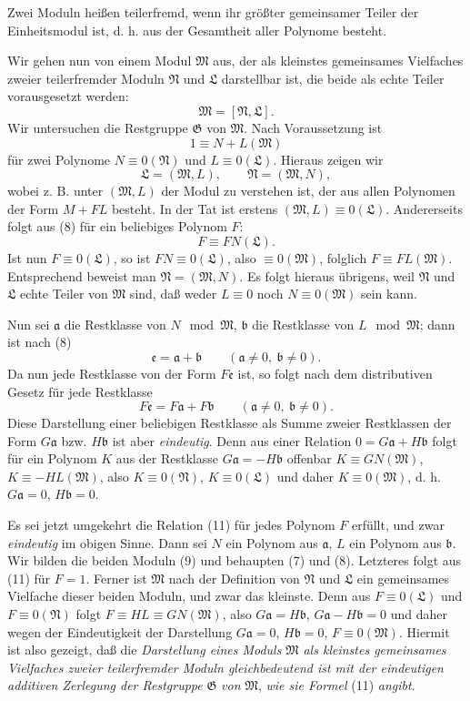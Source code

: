\documentclass[11pt]{article}
\newcommand{\mM}{\mathfrak{M}}
\newcommand{\mN}{\mathfrak{N}}
\newcommand{\mL}{\mathfrak{L}}
\newcommand{\mG}{\mathfrak{G}}
\newcommand{\ma}{\mathfrak{a}}
\newcommand{\mb}{\mathfrak{b}}
\newcommand{\me}{\mathfrak{e}}
\begin{document}
Zwei Moduln heißen teilerfremd, wenn ihr größter gemeinsamer Teiler der Einheitsmodul ist, d. h. aus der Gesamtheit aller Polynome besteht.

Wir gehen nun von einem Modul $\mM$ aus, der als kleinstes gemeinsames Vielfaches zweier teilerfremder Moduln $\mN$ und $\mL$ darstellbar ist, die beide als echte Teiler vorausgesetzt werden:
\begin{equation}
 \mM=[\mN,\mL].
\tag{7}
\end{equation}
Wir untersuchen die Restgruppe $\mG$ von $\mM$. Nach Voraussetzung ist
\begin{equation}
 1\equiv N+L(\mM)
\tag{8}
\end{equation}
für zwei Polynome $N\equiv0(\mN)$ und $L\equiv0(\mL)$. Hieraus zeigen wir
\begin{equation}
 \mL=(\mM,L),\qquad \mN=(\mM,N),
\tag{9}
\end{equation}
wobei z. B. unter $(\mM,L)$ der Modul zu verstehen ist, der aus allen Polynomen der Form $M+FL$ besteht. In der Tat ist erstens $(\mM,L)\equiv0(\mL)$. Andererseits folgt aus (8) für ein beliebiges Polynom $F$:
\begin{equation}
 F\equiv FN(\mL).
\tag{10}
\end{equation}
Ist nun $F\equiv0(\mL)$, so ist $FN\equiv0(\mL)$, also $\equiv0(\mM)$, folglich $F\equiv FL(\mM)$. Entsprechend beweist man $\mN=(\mM,N)$. Es folgt hieraus übrigens, weil $\mN$ und $\mL$ echte Teiler von $\mM$ sind, daß weder $L\equiv0$ noch $N\equiv0(\mM)$ sein kann.

Nun sei $\ma$ die Restklasse von $N\mod\mM$, $\mb$ die Restklasse von $L\mod\mM$; dann ist nach (8)
\[
 \me=\ma+\mb\qquad(\ma\ne0,\ \mb\ne0).
\]
Da nun jede Restklasse von der Form $F\me$ ist, so folgt nach dem distributiven Gesetz für jede Restklasse
\begin{equation}
 F\me=F\ma+F\mb\qquad(\ma\ne0,\ \mb\ne0).
\tag{11}
\end{equation}
Diese Darstellung einer beliebigen Restklasse als Summe zweier Restklassen der Form $G\ma$ bzw. $H\mb$ ist aber \emph{eindeutig}. Denn aus einer Relation $0=G\ma+H\mb$ folgt für ein Polynom $K$ aus der Restklasse $G\ma=-H\mb$ offenbar $K\equiv GN(\mM)$, $K\equiv-HL(\mM)$, also $K\equiv0(\mN)$, $K\equiv0(\mL)$ und daher $K\equiv0(\mM)$, d. h. $G\ma=0$, $H\mb=0$.

Es sei jetzt umgekehrt die Relation (11) für jedes Polynom $F$ erfüllt, und zwar \emph{eindeutig} im obigen Sinne. Dann sei $N$ ein Polynom aus $\ma$, $L$ ein Polynom aus $\mb$. Wir bilden die beiden Moduln (9) und behaupten (7) und (8). Letzteres folgt aus (11) für $F=1$. Ferner ist $\mM$ nach der Definition von $\mN$ und $\mL$ ein gemeinsames Vielfache dieser beiden Moduln, und zwar das kleinste. Denn aus $F\equiv0(\mL)$ und $F\equiv0(\mN)$ folgt $F\equiv HL\equiv GN(\mM)$, also $G\ma=H\mb$, $G\ma-H\mb=0$ und daher wegen der Eindeutigkeit der Darstellung $G\ma=0$, $H\mb=0$, $F\equiv0(\mM)$. Hiermit ist also gezeigt, daß die \emph{Darstellung eines Moduls} $\mM$ \emph{als kleinstes gemeinsames Vielfaches zweier teilerfremder Moduln gleichbedeutend ist mit der eindeutigen additiven Zerlegung der Restgruppe} $\mG$ \emph{von} $\mM$, \emph{wie sie Formel} (11) \emph{angibt}.
\end{document}
